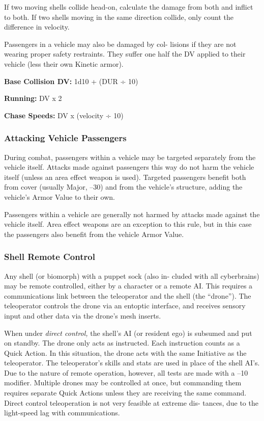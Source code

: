 If two moving shells collide head-on, calculate the 
damage from both and inflict to both. If two shells 
moving in the same direction collide, only count the 
difference in velocity.

Passengers in a vehicle may also be damaged by col-
lisions if they are not wearing proper safety restraints. 
They suffer one half the DV applied to their vehicle 
(less their own Kinetic armor).

\textbf{Base Collision DV:} 1d10 + (DUR ÷ 10)

\textbf{Running:} DV x 2

\textbf{Chase Speeds:} DV x (velocity ÷ 10)

\subsubsection{Attacking Vehicle Passengers}

During combat, passengers within a vehicle may be 
targeted separately from the vehicle itself. Attacks 
made against passengers this way do not harm the 
vehicle itself (unless an area effect weapon is used). 
Targeted passengers benefit both from cover (usually 
Major, –30) and from the vehicle's structure, adding 
the vehicle's Armor Value to their own.

Passengers within a vehicle are generally not harmed 
by attacks made against the vehicle itself. Area effect 
weapons are an exception to this rule, but in this case 
the passengers also benefit from the vehicle Armor Value.

\subsubsection{Shell Remote Control}

Any shell (or biomorph) with a puppet sock (also in-
cluded with all cyberbrains) may be remote controlled, 
either by a character or a remote AI. This requires a 
communications link between the teleoperator and 
the shell (the ``drone''). The teleoperator controls the 
drone via an entoptic interface, and receives sensory 
input and other data via the drone's mesh inserts.

When under \textit{direct control,} the shell's AI (or resident 
ego) is subsumed and put on standby. The drone only 
acts as instructed. Each instruction counts as a Quick 
Action. In this situation, the drone acts with the same 
Initiative as the teleoperator. The teleoperator's skills and 
stats are used in place of the shell AI's. Due to the nature 
of remote operation, however, all tests are made with a 
–10 modifier. Multiple drones may be controlled at once, 
but commanding them requires separate Quick Actions 
unless they are receiving the same command. Direct 
control teleoperation is not very feasible at extreme dis-
tances, due to the light-speed lag with communications.

